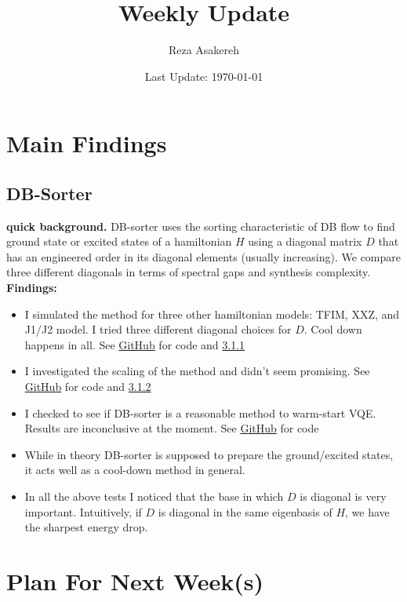 \documentclass[11pt]{article}
\title{Weekly Update}
\author{Reza Asakereh}
\date{Last Update: \today}
\begin{document}
\maketitle

\section{Main Findings}
\subsection{DB-Sorter}
\textbf{quick background.} DB-sorter uses the sorting characteristic of DB flow to find ground state or excited states of a hamiltonian $H$ using a diagonal matrix $D$ that has an engineered order in its diagonal elements (usually increasing). We compare three different diagonals in terms of spectral gaps and synthesis complexity. 
\\

\textbf{Findings:}
\begin{itemize}
    \item I simulated the method for three other hamiltonian models: TFIM, XXZ, and J1/J2 model. I tried three different diagonal choices for $D$. Cool down happens in all. See \href{https://github.com/rasakereh/double-bracket-algo/blob/master/examples/different_diagonals.py}{GitHub} for code and \hyperref[sec:simulation-runs]{3.1.1}
    \item I investigated the scaling of the method and didn't seem promising. See \href{https://github.com/rasakereh/double-bracket-algo/blob/master/examples/scaling_check.py}{GitHub} for code and \hyperref[sec:scaling]{3.1.2}
    \item I checked to see if DB-sorter is a reasonable method to warm-start VQE. Results are inconclusive at the moment. See \href{https://github.com/rasakereh/double-bracket-algo/blob/master/examples/db_as_warm_start.py}{GitHub} for code
    \item While in theory DB-sorter is supposed to prepare the ground/excited states, it acts well as a cool-down method in general.
    \item In all the above tests I noticed that the base in which $D$ is diagonal is very important. Intuitively, if $D$ is diagonal in the same eigenbasis of $H$, we have the sharpest energy drop.
\end{itemize}


\section{Plan For Next Week(s)}
\end{document}
